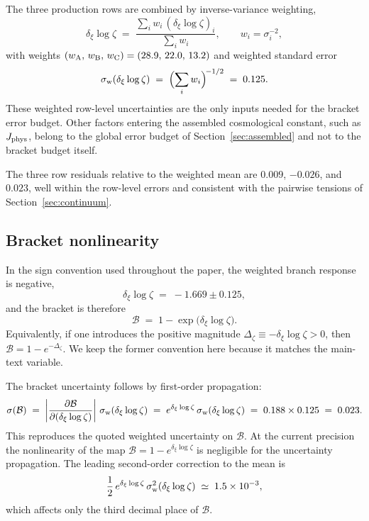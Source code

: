 \documentclass[a4paper,11pt]{article}
\theoremstyle{definition}
\newcommand{\Jphys}{J_{\rm phys}}
\newcommand{\Bobs}{\mathcal{B}}
\begin{document}
The three production rows are combined by inverse-variance weighting,
\begin{equation}
\delta_\xi \log\zeta
\;=\;
\frac{\sum_i w_i\, (\delta_\xi \log\zeta)_i}{\sum_i w_i},
\qquad
w_i = \sigma_i^{-2},
\label{eq:app-weighted-mean}
\end{equation}
with weights $(w_{\rm A},\,w_{\rm B},\,w_{\rm C}) = (28.9,\,22.0,\,13.2)$
and weighted standard error
\begin{equation}
\sigma_{\rm w}(\delta_\xi \log\zeta)
\;=\;
\Bigl(\sum_i w_i\Bigr)^{\!-1/2}
\;=\; 0.125.
\label{eq:app-sigma-w}
\end{equation}
These weighted row-level uncertainties are the only inputs needed for
the bracket error budget. Other factors entering the assembled
cosmological constant, such as $\Jphys$, belong to the global error
budget of Section~\ref{sec:assembled} and not to the bracket budget
itself.

The three row residuals relative to the weighted mean are $0.009$,
$-0.026$, and $0.023$, well within the row-level errors and consistent
with the pairwise tensions of Section~\ref{sec:continuum}.

\subsection{Bracket nonlinearity}
\label{app:err-bracket-nonlinearity}

In the sign convention used throughout the paper, the weighted branch
response is negative,
\[
\delta_\xi \log\zeta \;=\; -1.669 \pm 0.125,
\]
and the bracket is therefore
\begin{equation}
\Bobs \;=\; 1 - \exp\!\bigl(\delta_\xi \log\zeta\bigr).
\label{eq:app-bracket-map}
\end{equation}
Equivalently, if one introduces the positive magnitude
$\Delta_\zeta \equiv -\delta_\xi \log\zeta > 0$, then
$\Bobs = 1 - e^{-\Delta_\zeta}$. We keep the former convention here
because it matches the main-text variable.

The bracket uncertainty follows by first-order propagation:
\begin{equation}
\sigma(\Bobs)
\;=\;
\left|\frac{\partial \Bobs}{\partial(\delta_\xi\log\zeta)}\right|
\,\sigma_{\rm w}(\delta_\xi \log\zeta)
\;=\;
e^{\delta_\xi \log\zeta}\,\sigma_{\rm w}(\delta_\xi \log\zeta)
\;=\; 0.188 \times 0.125
\;=\; 0.023.
\label{eq:app-sigma-bracket}
\end{equation}
This reproduces the quoted weighted uncertainty on $\Bobs$. At the
current precision the nonlinearity of the map
$\Bobs = 1 - e^{\delta_\xi\log\zeta}$ is negligible for the uncertainty
propagation. The leading second-order correction to the mean is
\begin{equation}
\frac{1}{2}\,e^{\delta_\xi \log\zeta}\,
\sigma_{\rm w}^2(\delta_\xi \log\zeta)
\;\simeq\; 1.5\times 10^{-3},
\label{eq:app-bracket-second-order}
\end{equation}
which affects only the third decimal place of $\Bobs$.
\end{document}
